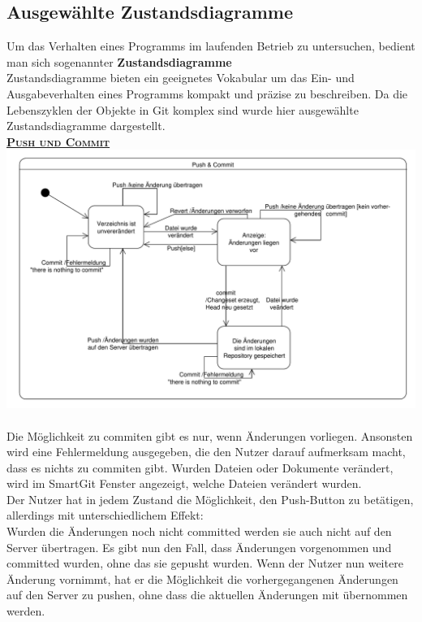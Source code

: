 \documentclass[a4paper]{article}
\begin{document}
\newpage		
\subsection{Ausgewählte Zustandsdiagramme} \label{sec:zustandsd}

	Um das Verhalten eines Programms im laufenden Betrieb zu untersuchen, bedient man sich sogenannter \textbf{Zustandsdiagramme} \\
	Zustandsdiagramme bieten ein geeignetes Vokabular um das Ein- und Ausgabeverhalten eines Programms kompakt und präzise zu beschreiben.
	Da die Lebenszyklen der Objekte in Git komplex sind wurde hier ausgewählte Zustandsdiagramme dargestellt. \\

\underline{\textbf{\textsc{Push und Commit}}} \\
\includegraphics[width=\textwidth]{PuCo_Baar.pdf}\\\\
Die Möglichkeit zu commiten gibt es nur, wenn Änderungen vorliegen. Ansonsten wird eine Fehlermeldung ausgegeben, die den Nutzer darauf aufmerksam macht, dass es nichts zu commiten gibt.
Wurden Dateien oder Dokumente verändert, wird im SmartGit Fenster angezeigt, welche Dateien verändert wurden.\\
Der Nutzer hat in jedem Zustand die Möglichkeit, den Push-Button zu betätigen, allerdings mit unterschiedlichem Effekt:\\
Wurden die Änderungen noch nicht committed werden sie auch nicht auf den Server übertragen.
Es gibt nun den Fall, dass Änderungen vorgenommen und committed wurden, ohne das sie gepusht wurden.
Wenn der Nutzer nun weitere Änderung vornimmt, hat er die Möglichkeit die vorhergegangenen Änderungen auf den Server zu pushen, ohne dass die aktuellen Änderungen mit übernommen werden. 
\end{document}
